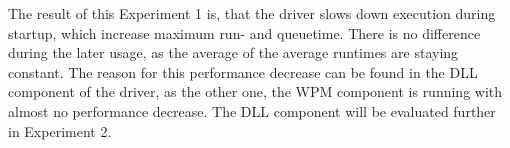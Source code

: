 \medskip

The result of this Experiment 1 is, that the driver slows down execution during startup, which increase maximum run- and queuetime. There is no difference during the later usage, as the average of the average runtimes are staying constant. The reason for this performance decrease can be found in the \gls{DLL} component of the driver, as the other one, the \gls{WPM} component is running with almost no performance decrease. The \gls{DLL} component will be evaluated further in Experiment 2.
